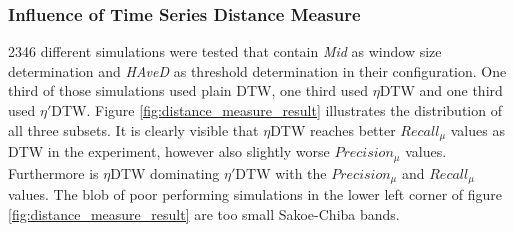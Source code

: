 \subsubsection{Influence of Time Series Distance Measure} \label{influence_of_time_series_distance_measure}
2346 different simulations were tested that contain \textit{Mid} as window size determination and
\textit{HAveD} as threshold determination in their configuration. One third of those simulations used plain DTW, one
third used $\eta$DTW and one third used $\eta '$DTW. Figure \ref{fig:distance_measure_result}
illustrates the distribution of all three subsets. It is clearly visible that $\eta$DTW reaches better $Recall_{\mu}$
values as DTW in the experiment, however also slightly worse $Precision_{\mu}$ values. Furthermore is $\eta$DTW
dominating $\eta '$DTW with the $Precision_{\mu}$ and $Recall_{\mu}$ values. The blob of poor performing simulations in
the lower left corner of figure \ref{fig:distance_measure_result} are too small Sakoe-Chiba bands.


